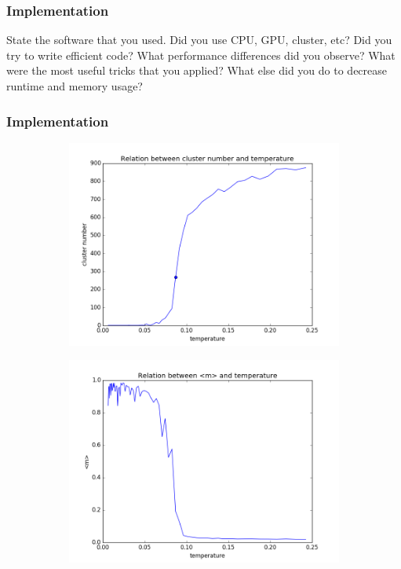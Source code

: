 \documentclass{beamer}
\begin{document}
\begin{frame}[fragile]
\frametitle{Implementation}
State the software that you used. Did you use CPU, GPU, cluster, etc? Did you try to write efficient code? What performance differences did you observe? What were the most useful tricks that you applied? What else did you do to decrease runtime and memory usage?

\end{frame}


\begin{frame}[fragile]
\frametitle{Implementation}
\begin{figure}
\centering
\begin{subfigure}{0.45\textwidth}
  \centering
  \includegraphics[width=.8\linewidth]{fig/cluster_num.png}
  \caption{}%
  \label{fig:cluster_num}
\end{subfigure}
\hspace*{\fill}
\begin{subfigure}{0.45\textwidth}
  \centering
  \includegraphics[width=.8\linewidth]{fig/magnetization.png}
  \caption{}%
  \label{fig:magnetization}
\end{subfigure}
\begin{subfigure}{0.45\textwidth}
  \centering
  

\end{subfigure}
\end{figure}
\end{frame}
\end{document}
